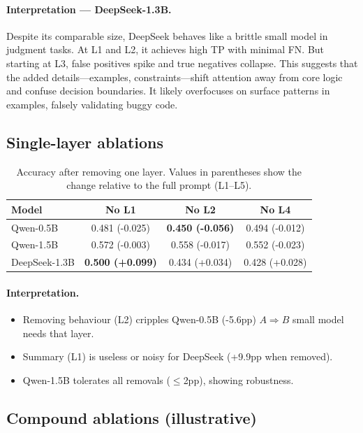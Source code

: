\documentclass[a4paper]{usiinfbachelorproject}
\begin{document}
\paragraph*{Interpretation — DeepSeek-1.3B.}
Despite its comparable size, DeepSeek behaves like a brittle small model in judgment tasks. At L1 and L2, it achieves high TP with minimal FN. But starting at L3, false positives spike and true negatives collapse. This suggests that the added details—examples, constraints—shift attention away from core logic and confuse decision boundaries. It likely overfocuses on surface patterns in examples, falsely validating buggy code.



\subsection{Single-layer ablations}

\begin{table}[H]\centering
\caption{Accuracy after removing one layer. Values in parentheses show the change relative to the full prompt (L1--L5).}
\begin{tabular}{lccc}
\toprule
\textbf{Model} & \textbf{No L1} & \textbf{No L2} & \textbf{No L4} \\ \midrule
Qwen-0.5B  & 0.481 (-0.025) & \textbf{0.450 (-0.056)} & 0.494 (-0.012) \\
Qwen-1.5B  & 0.572 (-0.003) & 0.558 (-0.017) & 0.552 (-0.023) \\
DeepSeek-1.3B & \textbf{0.500 (+0.099)} & 0.434 (+0.034) & 0.428 (+0.028) \\
\bottomrule
\end{tabular}
\end{table}

\paragraph*{Interpretation.}
\begin{itemize}[leftmargin=12pt,itemsep=0pt]
  \item Removing behaviour (L2) cripples Qwen-0.5B (-5.6pp) $A \Rightarrow B$
 small model needs that layer.  
  \item Summary (L1) is useless or noisy for DeepSeek (+9.9pp when removed).  
  \item Qwen-1.5B tolerates all removals ($\leq$2pp), showing robustness.
\end{itemize}

\subsection{Compound ablations (illustrative)}
\end{document}
